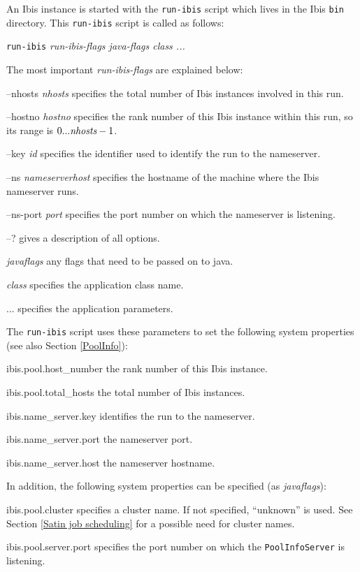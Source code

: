\documentclass[10pt]{article}
\begin{document}
An Ibis instance is started with the \texttt{run-ibis} script which
lives in the Ibis \texttt{bin} directory.  This \texttt{run-ibis}
script is called as follows:
\begin{center}
\texttt{run-ibis} \emph{run-ibis-flags java-flags class ...}
\end{center}
The most important \emph{run-ibis-flags} are explained below:
\begin{description}
\item{--nhosts \emph{nhosts}}
specifies the total number of Ibis instances involved in this run.
\item{--hostno \emph{hostno}}
specifies the rank number of this Ibis instance within this run,
so its range is $0 ... \emph{nhosts}-1$.
\item{--key \emph{id}}
specifies the identifier used to identify the run to the nameserver.
\item{--ns \emph{nameserverhost}}
specifies the hostname of the machine where the Ibis nameserver runs.
\item{--ns-port \emph{port}}
specifies the port number on which the nameserver is listening.
\item{--?}
gives a description of all options.
\item{\emph{javaflags}}
any flags that need to be passed on to java.
\item{\emph{class}}
specifies the application class name.
\item{...}
specifies the application parameters.
\end{description}

The \texttt{run-ibis} script uses these parameters to set the following
system properties (see also Section \ref{PoolInfo}):
\begin{description}
\item{ibis.pool.host\_number}
the rank number of this Ibis instance.
\item{ibis.pool.total\_hosts}
the total number of Ibis instances.
\item{ibis.name\_server.key}
identifies the run to the nameserver.
\item{ibis.name\_server.port}
the nameserver port.
\item{ibis.name\_server.host}
the nameserver hostname.
\end{description}

In addition, the following system properties can be specified
(as \emph{javaflags}):
\begin{description}
\item{ibis.pool.cluster}
specifies a cluster name. If not specified,
``unknown'' is used.
See Section \ref{Satin job scheduling} for a possible need for cluster
names.
\item{ibis.pool.server.port}
specifies the port number on which the
\texttt{PoolInfoServer} is listening.
\end{description}
\end{document}

